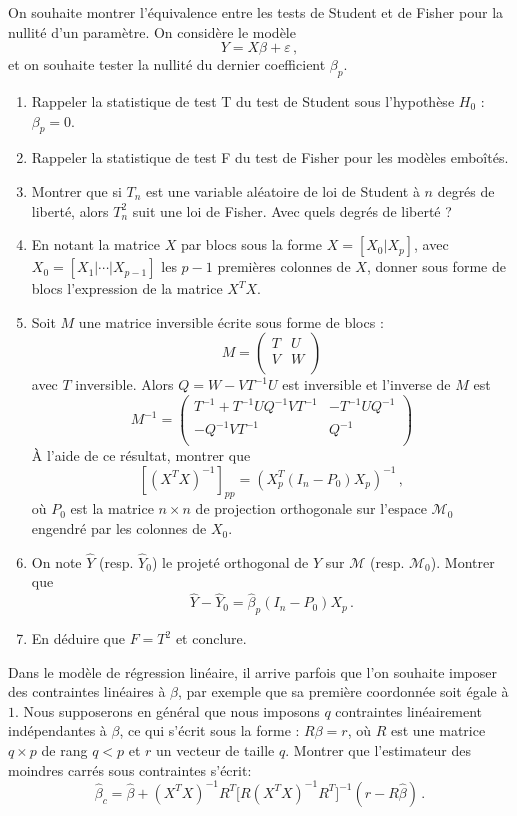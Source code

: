 \documentclass{../td_um}
\providecommand{\1}{\mathds{1}}
\begin{document}
	On souhaite montrer l'équivalence entre les tests de Student et de Fisher pour la nullité d'un paramètre. On considère le modèle
	\[
	Y = X \beta + \varepsilon\,,
	\]
	et on souhaite tester la nullité du dernier coefficient $\beta_p$.
	\begin{enumerate}
		\item Rappeler la statistique de test T du test de Student sous l'hypothèse $H_0$ : $\beta_p = 0$.
		\item Rappeler la statistique de test F du test de Fisher pour les modèles emboîtés.
		\item Montrer que si $T_n$ est une variable aléatoire de loi de Student à $n$ degrés de liberté, alors $T_n^2$ suit une loi de Fisher. Avec quels degrés de liberté ?
		\item En notant la matrice $X$ par blocs sous la forme $X = [X_0 | X_p]$, avec $X_0 = [X_1 | \cdots | X_{p-1}]$ les $p-1$ premières colonnes de $X$, donner sous forme de blocs l'expression de la matrice $X^T X$.
		\item Soit $M$ une matrice inversible écrite sous forme de blocs :
		\[
		M =\left (
		\begin{array}{c|c}
			T & U \\
			\hline
			V & W\\ 
		\end{array}
		\right)
		\]
		avec $T$ inversible. Alors $Q = W - VT^{-1}U$ est inversible et l'inverse de $M$ est
		\[
		M^{-1} = \left (
		\begin{array}{c|c}
			T^{-1} + T^{-1}UQ^{-1}VT^{-1} & -T^{-1}UQ^{-1} \\
			\hline
			-Q^{-1}VT^{-1} & Q^{-1}\\ 
		\end{array}
		\right)
		\]
		À l'aide de ce résultat, montrer que
		\[
		[(X^T X)^{-1}]_{pp} = (X_p^T (I_n - P_0) X_p)^{-1}\,,
		\]
		où $P_0$ est la matrice $n \times n$ de projection orthogonale sur l'espace $\mathcal{M}_0$ engendré par les colonnes de $X_0$.
		\item On note $\hat Y$ (resp. $\hat Y_0$) le projeté orthogonal de $Y$ sur $\mathcal{M}$ (resp. $\mathcal{M}_0$). Montrer que
		\[
		\hat Y - \hat Y_0 = \hat \beta_p (I_n - P_0) X_p\,.
		\]
		\item En déduire que $F = T^2$ et conclure.
	\end{enumerate}
	
	 Dans le modèle de régression linéaire, il arrive parfois que l'on souhaite imposer des contraintes linéaires à $\beta$, par exemple que sa première coordonnée soit égale à $1$. Nous supposerons en général que nous imposons $q$ contraintes linéairement indépendantes à $\beta$, ce qui s'écrit sous la forme : $R \beta=r$, où $R$ est une matrice $q \times p$ de rang $q<p$ et $r$ un vecteur de taille $q$. Montrer que l'estimateur des moindres carrés sous contraintes s'écrit:
	\[
	\hat \beta_c = \hat \beta + (X^T X)^{-1} R^T  \big[ R (X^T X)^{-1} R^T \big]^{-1} (r - R \hat \beta)\,.
	\]
	
\end{document}
